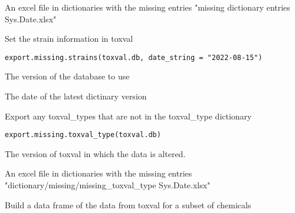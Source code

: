 \documentclass[letterpaper]{book}
\begin{document}
%
\begin{Value}
An excel file in dictionaries with the missing entries
"missing dictionary entries Sys.Date.xlsx"
\end{Value}
%
\begin{Description}\relax
Set the strain information in toxval
\end{Description}
%
\begin{Usage}
\begin{verbatim}
export.missing.strains(toxval.db, date_string = "2022-08-15")
\end{verbatim}
\end{Usage}
%
\begin{Arguments}
\begin{ldescription}
\item[\code{toxval.db}] The version of the database to use

\item[\code{date\_string}] The date of the latest dictinary version
\end{ldescription}
\end{Arguments}
%
\begin{Description}\relax
Export any toxval\_types that are not in the toxval\_type dictionary
\end{Description}
%
\begin{Usage}
\begin{verbatim}
export.missing.toxval_type(toxval.db)
\end{verbatim}
\end{Usage}
%
\begin{Arguments}
\begin{ldescription}
\item[\code{toxval.db}] The version of toxval in which the data is altered.
\end{ldescription}
\end{Arguments}
%
\begin{Value}
An excel file in dictionaries with the missing entries
"dictionary/missing/missing\_toxval\_type Sys.Date.xlsx"
\end{Value}
%
\begin{Description}\relax
Build a data frame of the data from toxval for a subset of chemicals
\end{Description}
\end{document}
